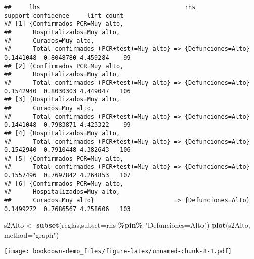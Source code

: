 \documentclass[
]{book}
\newenvironment{Shaded}{\begin{snugshade}}{\end{snugshade}}
\newcommand{\DataTypeTok}[1]{\textcolor[rgb]{0.13,0.29,0.53}{#1}}
\newcommand{\KeywordTok}[1]{\textcolor[rgb]{0.13,0.29,0.53}{\textbf{#1}}}
\newcommand{\NormalTok}[1]{#1}
\newcommand{\OperatorTok}[1]{\textcolor[rgb]{0.81,0.36,0.00}{\textbf{#1}}}
\newcommand{\StringTok}[1]{\textcolor[rgb]{0.31,0.60,0.02}{#1}}
\begin{document}
\begin{verbatim}
##     lhs                                        rhs                  support confidence     lift count
## [1] {Confirmados PCR=Muy alto,                                                                       
##      Hospitalizados=Muy alto,                                                                        
##      Curados=Muy alto,                                                                               
##      Total confirmados (PCR+test)=Muy alto} => {Defunciones=Alto} 0.1441048  0.8048780 4.459284    99
## [2] {Confirmados PCR=Muy alto,                                                                       
##      Hospitalizados=Muy alto,                                                                        
##      Total confirmados (PCR+test)=Muy alto} => {Defunciones=Alto} 0.1542940  0.8030303 4.449047   106
## [3] {Hospitalizados=Muy alto,                                                                        
##      Curados=Muy alto,                                                                               
##      Total confirmados (PCR+test)=Muy alto} => {Defunciones=Alto} 0.1441048  0.7983871 4.423322    99
## [4] {Hospitalizados=Muy alto,                                                                        
##      Total confirmados (PCR+test)=Muy alto} => {Defunciones=Alto} 0.1542940  0.7910448 4.382643   106
## [5] {Confirmados PCR=Muy alto,                                                                       
##      Total confirmados (PCR+test)=Muy alto} => {Defunciones=Alto} 0.1557496  0.7697842 4.264853   107
## [6] {Confirmados PCR=Muy alto,                                                                       
##      Hospitalizados=Muy alto,                                                                        
##      Curados=Muy alto}                      => {Defunciones=Alto} 0.1499272  0.7686567 4.258606   103
\end{verbatim}

\begin{Shaded}
\begin{Highlighting}[]
\NormalTok{s2Alto \textless{}{-}}\StringTok{ }\KeywordTok{subset}\NormalTok{(reglas,}\DataTypeTok{subset=}\NormalTok{rhs }\OperatorTok{\%pin\%}\StringTok{ "Defunciones=Alto"}\NormalTok{)}
\KeywordTok{plot}\NormalTok{(s2Alto, }\DataTypeTok{method=}\StringTok{"graph"}\NormalTok{)}
\end{Highlighting}
\end{Shaded}

\texttt{[image: bookdown-demo\_files/figure-latex/unnamed-chunk-8-1.pdf]}
\end{document}
